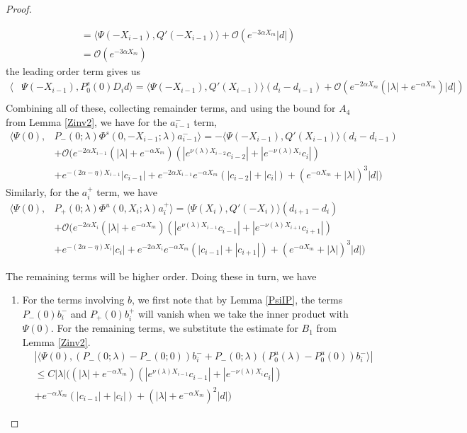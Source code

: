 \documentclass[thesis.tex]{subfiles}
\begin{document}
\begin{lemma}
\begin{proof}
\begin{enumerate}
\begin{align*}
&= \langle \Psi(-X_{i-1}), Q'(-X_{i-1})\rangle + \mathcal{O}(e^{-3 \alpha X_m}|d|) \\
&= \mathcal{O}(e^{-3 \alpha X_m})
\end{align*}
the leading order term gives us
\begin{align*}
\langle &\Psi(-X_{i-1}), P_0^s(0) D_i d \rangle = \langle \Psi(-X_{i-1}), Q'(X_{i-1}) \rangle (d_i - d_{i-1} ) + \mathcal{O}(e^{-2 \alpha X_m}(|\lambda| + e^{-\alpha X_m})|d|) \\
\end{align*}
Combining all of these, collecting remainder terms, and using the bound for $A_4$ from Lemma \ref{Zinv2}, we have for the $a_{i-1}^-$ term,
\begin{align*}
\langle \Psi(0), &P_-(0; \lambda) \Phi^s(0, -X_{i-1}; \lambda) a_{i-1}^- \rangle = -\langle \Psi(-X_{i-1}), Q'(X_{i-1}) \rangle (d_i - d_{i-1} ) \\
&+ \mathcal{O}\Big(  
e^{-2\alpha X_{i-1}} (|\lambda| + e^{-\alpha X_m})(|e^{\nu(\lambda)X_{i-2}} c_{i-2}| + |e^{-\nu(\lambda)X_i}c_i|) \\
&+ e^{-(2 \alpha - \eta)X_{i-1}}|c_{i-1}| + e^{-2\alpha X_{i-1}} e^{-\alpha X_m}(|c_{i-2}| + |c_i|) + (e^{-\alpha X_m} + |\lambda|)^3 |d| \Big) 
\end{align*}
Similarly, for the $a_i^+$ term, we have
\begin{align*}
\langle \Psi(0), &P_+(0; \lambda) \Phi^u(0, X_i; \lambda) a_i^+ \rangle = \langle \Psi(X_i), Q'(-X_i) \rangle (d_{i+1} - d_i ) \\
&+ \mathcal{O}\Big( e^{-2\alpha X_i} (|\lambda| + e^{-\alpha X_m})(|e^{\nu(\lambda)X_{i-1}} c_{i-1}| + |e^{-\nu(\lambda)X_{i+1}}c_{i+1}|) \nonumber \\
&+ e^{-(2\alpha - \eta)X_i}|c_i| + e^{-2\alpha X_i} e^{-\alpha X_m}(|c_{i-1}| + |c_{i+1}|) + (e^{-\alpha X_m} + |\lambda|)^3 |d| \Big) 
\end{align*}
\end{enumerate}

The remaining terms will be higher order. Doing these in turn, we have

\begin{enumerate}

\item For the terms involving $b$, we first note that by Lemma \ref{PsiIP}, the terms $P_-(0) b_i^-$ and $P_+(0)b_i^+$ will vanish when we take the inner product with $\Psi(0)$. For the remaining terms, we substitute the estimate for $B_1$ from Lemma \ref{Zinv2}.
\begin{align*}
&|\langle \Psi(0), (P_-(0; \lambda) - P_-(0; 0))b_i^- + P_-(0; \lambda)(P_0^u(\lambda) - P_0^u(0))b_i^- \rangle | \\
&\leq C |\lambda| \Big( (|\lambda| + e^{-\alpha X_m})(|e^{\nu(\lambda)X_{i-1}} c_{i-1}| + |e^{-\nu(\lambda)X_i} c_i|) \\
&+ e^{-\alpha X_m}(|c_{i-1}| + |c_i|) + (|\lambda| + e^{-\alpha X_m})^2 |d|  \Big)
\end{align*}


\end{enumerate}
\end{proof}
\end{lemma}
\end{document}
